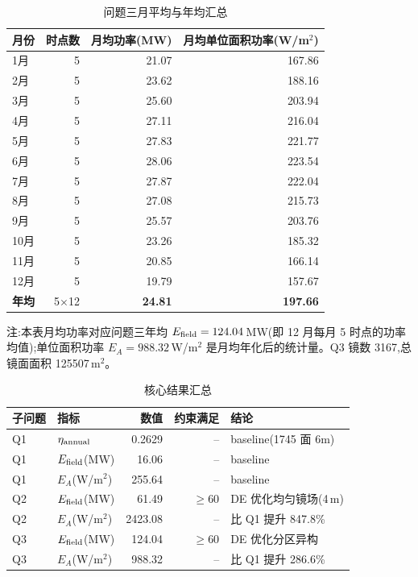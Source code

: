 \documentclass[UTF8,a4paper,12pt]{ctexart}
\begin{document}
\begin{table}[H]
  \centering
  \caption{问题三月平均与年均汇总}
  \label{tab:q3-monthly}
  \begin{tabular}{lrrr}
    \toprule
    月份 & 时点数 & 月均功率(MW) & 月均单位面积功率(W/m$^2$) \\
    \midrule
    1月 & 5 & 21.07 & 167.86 \\
    2月 & 5 & 23.62 & 188.16 \\
    3月 & 5 & 25.60 & 203.94 \\
    4月 & 5 & 27.11 & 216.04 \\
    5月 & 5 & 27.83 & 221.77 \\
    6月 & 5 & 28.06 & 223.54 \\
    7月 & 5 & 27.87 & 222.04 \\
    8月 & 5 & 27.08 & 215.73 \\
    9月 & 5 & 25.57 & 203.76 \\
    10月 & 5 & 23.26 & 185.32 \\
    11月 & 5 & 20.85 & 166.14 \\
    12月 & 5 & 19.79 & 157.67 \\
    \midrule
    \textbf{年均} & 5$\times$12 & \textbf{24.81} & \textbf{197.66} \\
    \bottomrule
  \end{tabular}
\end{table}

\noindent 注:本表月均功率对应问题三年均 $E_{\rm field}=124.04$\,MW(即 12 月每月 5 时点的功率均值);单位面积功率 $E_A=988.32$\,W/m$^2$ 是月均年化后的统计量。Q3 镜数 3167,总镜面面积 125507\,m$^2$。

\begin{table}[H]
  \centering
  \caption{核心结果汇总}
  \label{tab:summary}
  \begin{tabular}{llrrl}
    \toprule
    子问题 & 指标 & 数值 & 约束满足 & 结论 \\
    \midrule
    Q1 & $\eta_{\rm annual}$ & 0.2629 & -- & baseline(1745 面 6m) \\
    Q1 & $E_{\rm field}$(MW) & 16.06 & -- & baseline \\
    Q1 & $E_A$(W/m$^2$) & 255.64 & -- & baseline \\
    Q2 & $E_{\rm field}$(MW) & 61.49 & $\ge 60$ & DE 优化均匀镜场(4\,m) \\
    Q2 & $E_A$(W/m$^2$) & 2423.08 & -- & 比 Q1 提升 847.8\% \\
    Q3 & $E_{\rm field}$(MW) & 124.04 & $\ge 60$ & DE 优化分区异构 \\
    Q3 & $E_A$(W/m$^2$) & 988.32 & -- & 比 Q1 提升 286.6\% \\
    \bottomrule
  \end{tabular}
\end{table}
\end{document}
